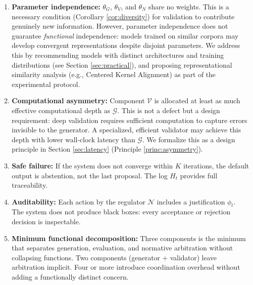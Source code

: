 \documentclass[11pt,a4paper]{article}
\theoremstyle{remark}
\begin{document}
\begin{enumerate}
  \item \textbf{Parameter independence:} $\theta_G$, $\theta_V$, and $\theta_N$ share no weights. This is a necessary condition (Corollary \ref{cor:diversity}) for validation to contribute genuinely new information. However, parameter independence does not guarantee \emph{functional} independence: models trained on similar corpora may develop convergent representations despite disjoint parameters. We address this by recommending models with distinct architectures and training distributions (see Section \ref{sec:practical}), and proposing representational similarity analysis (e.g., Centered Kernel Alignment) as part of the experimental protocol.
  
  \item \textbf{Computational asymmetry:} Component $\mathcal{V}$ is allocated at least as much effective computational depth as $\mathcal{G}$. This is not a defect but a design requirement: deep validation requires sufficient computation to capture errors invisible to the generator. A specialized, efficient validator may achieve this depth with lower wall-clock latency than $\mathcal{G}$. We formalize this as a design principle in Section \ref{sec:latency} (Principle \ref{princ:asymmetry}).
  
  \item \textbf{Safe failure:} If the system does not converge within $K$ iterations, the default output is abstention, not the last proposal. The log $H_t$ provides full traceability.
  
  \item \textbf{Auditability:} Each action by the regulator $\mathcal{N}$ includes a justification $\phi_t$. The system does not produce black boxes: every acceptance or rejection decision is inspectable.
  
  \item \textbf{Minimum functional decomposition:} Three components is the minimum that separates generation, evaluation, and normative arbitration without collapsing functions. Two components (generator + validator) leave arbitration implicit. Four or more introduce coordination overhead without adding a functionally distinct concern.
\end{enumerate}
\end{document}
